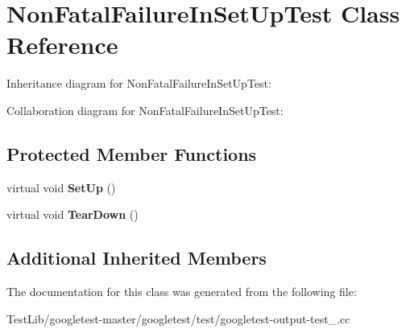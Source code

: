 \hypertarget{classNonFatalFailureInSetUpTest}{}\section{Non\+Fatal\+Failure\+In\+Set\+Up\+Test Class Reference}
\label{classNonFatalFailureInSetUpTest}


Inheritance diagram for Non\+Fatal\+Failure\+In\+Set\+Up\+Test\+:


Collaboration diagram for Non\+Fatal\+Failure\+In\+Set\+Up\+Test\+:
\subsection*{Protected Member Functions}
\begin{DoxyCompactItemize}
\item 
\mbox{\label{classNonFatalFailureInSetUpTest_ae24c724bae1fcd2601f58fa9c26adca3}} 
virtual void {\bfseries Set\+Up} ()
\item 
\mbox{\label{classNonFatalFailureInSetUpTest_a36abc808b11afc6a9bfa20dac5c28c30}} 
virtual void {\bfseries Tear\+Down} ()
\end{DoxyCompactItemize}
\subsection*{Additional Inherited Members}


The documentation for this class was generated from the following file\+:\begin{DoxyCompactItemize}
\item 
Test\+Lib/googletest-\/master/googletest/test/googletest-\/output-\/test\+\_\+.\+cc\end{DoxyCompactItemize}
